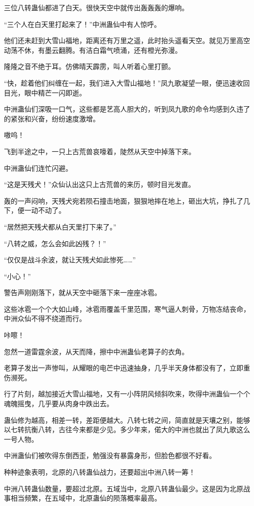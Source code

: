 \begin{this_body}
三位八转蛊仙都进了白天。很快天空中就传出轰轰轰的爆响。

“三个人在白天里打起来了！”中洲蛊仙中有人惊呼。

他们还未赶到大雪山福地，距离还有万里之遥，此时抬头遥看天空。就见万里高空动荡不休，有墨云翻腾。有洁白霜气喷涌，还有橙光弥漫。

隆隆之音不绝于耳。仿佛晴天霹雳，叫人听着心里打颤。

“快，趁着他们纠缠在一起，我们进入大雪山福地！”凤九歌凝望一眼，便迅速收回目光，眼中精芒一闪即逝。

中洲蛊仙们深吸一口气，这些都是艺高人胆大的，听到凤九歌的命令均感到久违了的紧张和兴奋，纷纷速度激增。

嗷呜！

飞到半途之中，一只上古荒兽哀嚎着，陡然从天空中掉落下来。

中洲蛊仙们连忙闪避。

“这是天残犬！”众仙认出这只上古荒兽的来历，顿时目光发直。

轰的一声闷响，天残犬宛若陨石撞击地面，狠狠地摔在地上，砸出大坑，挣扎了几下，便一动不动了。

“居然把天残犬都从白天里打下来了。”

“八转之威，怎么会如此凶残？！”

“仅仅是战斗余波，就让天残犬如此惨死……”

“小心！”

警告声刚刚落下，就从天空中砸落下来一座座冰雹。

这些冰雹一个个大如山峰，冰雹雨覆盖千里范围，寒气逼人刺骨，万物冻结丧命，中洲众仙不得不绕道而行。

咔嚓！

忽然一道雷霆余波，从天而降，擦中中洲蛊仙老算子的衣角。

老算子发出一声惨叫，从耀眼的电芒中迅速抽身，几乎半天身体都没有了，立即重伤濒死。

行了片刻，越加接近大雪山福地，又有一小阵阴风倾斜吹来，吹得中洲蛊仙一个个魂魄摇曳，几乎要从肉身中跌出去。

蛊仙修为越高，相差一转，差距便越大。八转七转之间，简直就是天壤之别，能够以七转抗衡八转，古往今来都是少见。多少年来，偌大的中洲也就出了凤九歌这么一号人物。

中洲蛊仙们被吹得东倒西歪，勉强没有暴露身形，但脸色都很不好看。

种种迹象表明，北原的八转蛊仙战力，还要超出中洲八转一筹！

中洲八转蛊仙数量，要超过北原。五域当中，北原八转蛊仙最少。这是因为北原战事相当频繁，在五域中，北原蛊仙的陨落概率最高。


\end{this_body}
